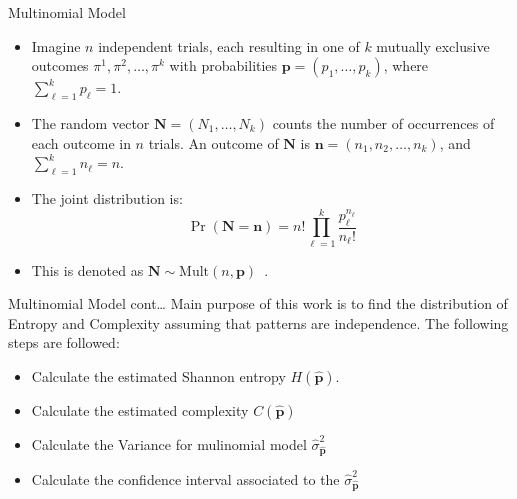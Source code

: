 \documentclass{beamer}
\begin{document}
\begin{frame}{Multinomial Model}
	\begin{itemize}
		\item Imagine $n$ independent trials, each resulting in one of $k$ mutually exclusive outcomes $\pi^1, \pi^2, \ldots, \pi^k$ with probabilities $\mathbf{p} = (p_1, \ldots, p_k)$, where $\sum_{\ell=1}^{k} p_\ell = 1$.
		\item The random vector $\mathbf{N} = (N_1, \ldots, N_k)$ counts the number of occurrences of each outcome in $n$ trials.
		An outcome of $\mathbf N$ is $\mathbf n=(n_1,n_2,\dots, n_k)$, and $\sum_{\ell=1}^{k} n_\ell = n$.
		\item The joint distribution is:
		\[
		\Pr(\mathbf{N} = \mathbf{n}) = n! \prod_{\ell=1}^{k} \frac{p_\ell^{n_\ell}}{n_\ell!}
		\]
		\item This is denoted as $\mathbf{N} \sim \text{Mult}(n, \mathbf{p})$~\cite{Rey2023}.
	\end{itemize}
\end{frame}


\begin{frame}{Multinomial Model cont\dots}
Main purpose of this work is to find the distribution of Entropy and Complexity assuming that patterns are independence. The following steps are followed:
		\begin{itemize}
		\item Calculate the estimated Shannon entropy $H(\widehat{\mathbf{p}})$.
		\item Calculate the estimated complexity $C(\widehat{\bm{p}})$ 
		\item Calculate the Variance for mulinomial model $\widehat{\sigma}^2_{\widehat{\mathbf{p}}}$  
		\item Calculate the confidence interval associated to the $\widehat{\sigma}^2_{\widehat{\mathbf{p}}}$  
	
	\end{itemize}
\end{frame}
\end{document}
